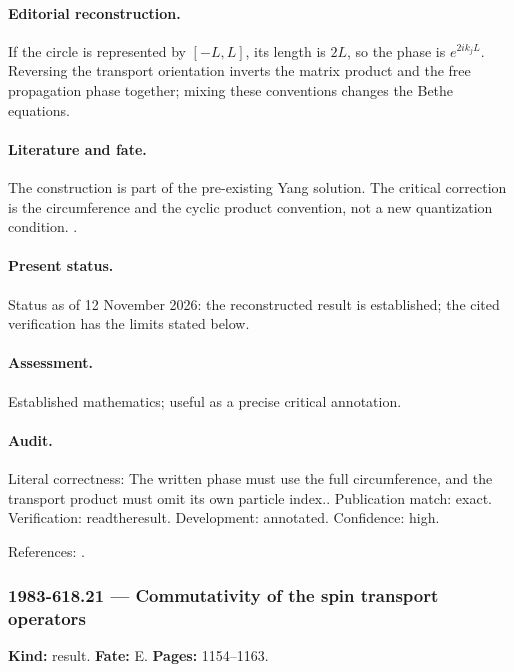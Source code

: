 \paragraph{Editorial reconstruction.} If the circle is represented by $[-L,L]$, its length is $2L$, so the phase is $e^{2ik_jL}$. Reversing the transport orientation inverts the matrix product and the free propagation phase together; mixing these conventions changes the Bethe equations.

\paragraph{Literature and fate.} The construction is part of the pre-existing Yang solution. The critical correction is the circumference and the cyclic product convention, not a new quantization condition. \citep{yang1967manybody}.

\paragraph{Present status.} Status as of 12 November 2026: the reconstructed result is established; the cited verification has the limits stated below.

\paragraph{Assessment.} Established mathematics; useful as a precise critical annotation.

\paragraph{Audit.} Literal correctness: The written phase must use the full circumference, and the transport product must omit its own particle index.. Publication match: exact. Verification: readtheresult. Development: annotated. Confidence: high.

\noindent References: \citep{yang1967manybody}.\par

\subsubsection{1983-618.21 --- Commutativity of the spin transport operators}

\label{item:1983-618.21}

\noindent\textbf{Kind:} result. \textbf{Fate:} E. \textbf{Pages:} 1154--1163.\par


